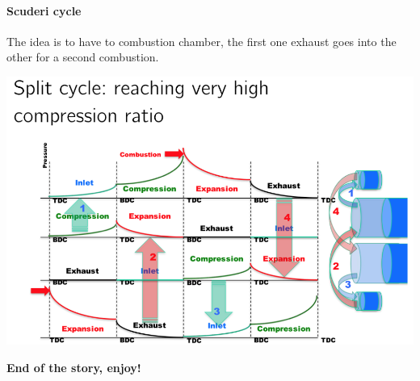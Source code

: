 \paragraph{Scuderi cycle} The idea is to have to combustion chamber, the first one exhaust goes into the other for a second combustion. 

\begin{center}
\includegraphics[scale=0.5]{ch8/5}
\end{center}

\textbf{End of the story, enjoy!}